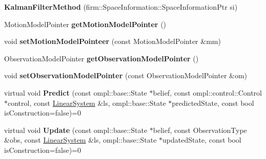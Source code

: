 \begin{DoxyCompactItemize}
\item 
\hypertarget{class_kalman_filter_method_afbea7fdb6e6faffd74de8ee647b97a02}{{\bfseries \-Kalman\-Filter\-Method} (firm\-::\-Space\-Information\-::\-Space\-Information\-Ptr si)}\label{class_kalman_filter_method_afbea7fdb6e6faffd74de8ee647b97a02}

\item 
\hypertarget{class_kalman_filter_method_aed467f00719c58d7be5458f8f99511d9}{\-Motion\-Model\-Pointer {\bfseries get\-Motion\-Model\-Pointer} ()}\label{class_kalman_filter_method_aed467f00719c58d7be5458f8f99511d9}

\item 
\hypertarget{class_kalman_filter_method_a7f2542d72d92f1e44cf4d0cdcaec02b8}{void {\bfseries set\-Motion\-Model\-Pointeer} (const \-Motion\-Model\-Pointer \&mm)}\label{class_kalman_filter_method_a7f2542d72d92f1e44cf4d0cdcaec02b8}

\item 
\hypertarget{class_kalman_filter_method_aa93f7e7e297eb337cc1fda8ae46763cc}{\-Observation\-Model\-Pointer {\bfseries get\-Observation\-Model\-Pointer} ()}\label{class_kalman_filter_method_aa93f7e7e297eb337cc1fda8ae46763cc}

\item 
\hypertarget{class_kalman_filter_method_a4b966a487acbbdda0f145be9a1da03d5}{void {\bfseries set\-Observation\-Model\-Pointer} (const \-Observation\-Model\-Pointer \&om)}\label{class_kalman_filter_method_a4b966a487acbbdda0f145be9a1da03d5}

\item 
\hypertarget{class_kalman_filter_method_ae8d8c8f2eeaca1a556cfc655d1897ce5}{virtual void {\bfseries \-Predict} (const ompl\-::base\-::\-State $\ast$belief, const ompl\-::control\-::\-Control $\ast$control, const \hyperlink{class_linear_system}{\-Linear\-System} \&ls, ompl\-::base\-::\-State $\ast$predicted\-State, const bool is\-Construction=false)=0}\label{class_kalman_filter_method_ae8d8c8f2eeaca1a556cfc655d1897ce5}

\item 
\hypertarget{class_kalman_filter_method_aac4f9c1f1a79821898891f2c13aa5cfc}{virtual void {\bfseries \-Update} (const ompl\-::base\-::\-State $\ast$belief, const \-Observation\-Type \&obs, const \hyperlink{class_linear_system}{\-Linear\-System} \&ls, ompl\-::base\-::\-State $\ast$updated\-State, const bool is\-Construction=false)=0}\label{class_kalman_filter_method_aac4f9c1f1a79821898891f2c13aa5cfc}


\end{DoxyCompactItemize}
